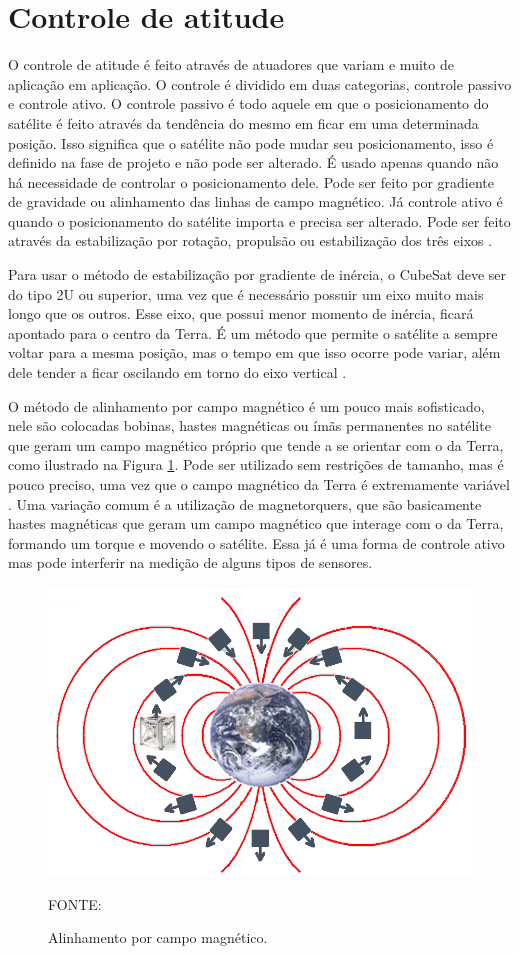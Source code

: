\documentclass[
	12pt,				%
	openany,			%
	twoside,			%
	a4paper,			%
	english,			%
	french,				%
	spanish,			%
	brazil,				%
	oldfontcommands
	]{abntex2}
\begin{document}
\section{Controle de atitude}

O controle de atitude é feito através de atuadores que variam e muito de aplicação em aplicação. O controle é dividido em duas categorias, controle passivo e controle ativo. O controle passivo é todo aquele em que o posicionamento do satélite é feito através da tendência do mesmo em ficar em uma determinada posição. Isso significa que o satélite não pode mudar seu posicionamento, isso é definido na fase de projeto e não pode ser alterado. É usado apenas quando não há necessidade de controlar o posicionamento dele. Pode ser feito por gradiente de gravidade ou alinhamento das linhas de campo magnético. Já controle ativo é quando o posicionamento do satélite importa e precisa ser alterado. Pode ser feito através da estabilização por rotação, propulsão ou estabilização dos três eixos \cite{FrancLav}.

Para usar o método de estabilização por gradiente de inércia, o CubeSat deve ser do tipo 2U ou superior, uma vez que é necessário possuir um eixo muito mais longo que os outros. Esse eixo, que possui menor momento de inércia, ficará apontado para o centro da Terra. É um método que permite o satélite a sempre voltar para a mesma posição, mas o tempo em que isso ocorre pode variar, além dele tender a ficar oscilando em torno do eixo vertical \cite{FrancLav}.

O método de alinhamento por campo magnético é um pouco mais sofisticado, nele são colocadas bobinas, hastes magnéticas ou ímãs permanentes no satélite que geram um campo magnético próprio que tende a se orientar com o da Terra, como ilustrado na Figura \ref{fig:Mag_Field}. Pode ser utilizado sem restrições de tamanho, mas é pouco preciso, uma vez que o campo magnético da Terra é extremamente variável \cite{FrancLav}. Uma variação comum é a utilização de magnetorquers, que são basicamente hastes magnéticas que geram um campo magnético que interage com o da Terra, formando um torque e movendo o satélite. Essa já é uma forma de controle ativo mas pode interferir na medição de alguns tipos de sensores.

\begin{figure}[th]
	\caption{Alinhamento por campo magnético.}
	\centering
	\includegraphics[width=0.6\linewidth]{./figs/Mag_Field}
	
	\begin{small}
		FONTE: \cite{FrancLav}
	\end{small}
	\label{fig:Mag_Field}
\end{figure}
\end{document}
